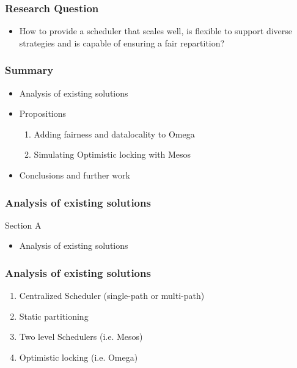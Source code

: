 \documentclass[notes=hide]{beamer}
\begin{document}
  \begin{frame}
    \frametitle{Research Question}
    \begin{itemize}
      \item
        How to provide a scheduler that scales well, is flexible to
        support diverse strategies and is capable of ensuring a fair
        repartition?
    \end{itemize}
  \end{frame}

  \note{}


  \begin{frame}
    \frametitle{Summary}
    \begin{itemize}
      \item[A] Analysis of existing solutions
      \item[B] Propositions
        \begin{enumerate}
          \item Adding fairness and datalocality to Omega
          \item Simulating Optimistic locking with Mesos
        \end{enumerate}
      \item[C] Conclusions and further work
    \end{itemize}
  \end{frame}

  \note{}

  \begin{frame}
    \frametitle{Analysis of existing solutions}
    \begin{block}{Section A}
    \begin{itemize}
         \item Analysis of existing solutions
    \end{itemize}
     \end{block}
  \end{frame}

  \begin{frame}
    \frametitle{Analysis of existing solutions}
    \begin{enumerate}
      \item Centralized Scheduler (single-path or multi-path)
      \item Static partitioning
      \item Two level Schedulers (i.e. Mesos)
      \item Optimistic locking (i.e. Omega)
    \end{enumerate}
  \end{frame}
\end{document}
